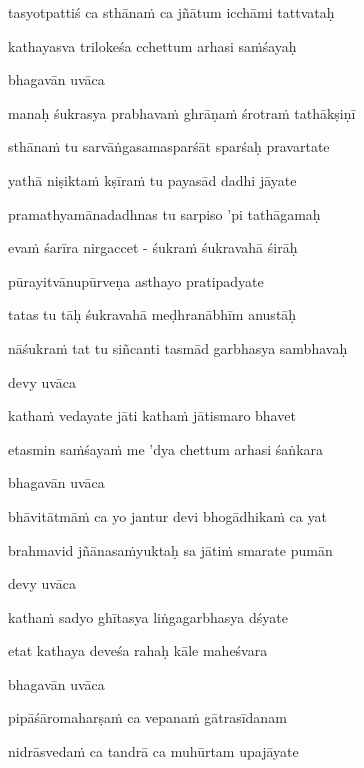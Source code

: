 tasyotpattiś ca sthāna\.m ca jñātum icchāmi tattvataḥ\thinspace{\dandab} \dontdisplaylinenum

kathayasva trilokeśa cchettum arhasi sa\.mśayaḥ \veg\dontdisplaylinenum

bhagavān uvāca~{\dandab}\dontdisplaylinenum 

manaḥ śukrasya prabhava\.m ghrāṇa\.m śrotra\.m tathākṣiṇī\thinspace{\danda} \dontdisplaylinenum

sthāna\.m tu sarvāṅgasamasparśāt sparśaḥ pravartate \veg\dontdisplaylinenum

yathā niṣikta\.m kṣīra\.m tu payasād dadhi jāyate\thinspace{\dandab} \dontdisplaylinenum

pramathyamānadadhnas tu sarpiso 'pi tathāgamaḥ \veg\dontdisplaylinenum

eva\.m śarīra nirgaccet - śukra\.m śukravahā śirāḥ\thinspace{\dandab} \dontdisplaylinenum

pūrayitvānupūrveṇa asthayo pratipadyate \veg\dontdisplaylinenum

tatas tu tāḥ śukravahā meḍhranābhīm anustāḥ\thinspace{\dandab} \dontdisplaylinenum

nāśukra\.m tat tu siñcanti tasmād garbhasya sambhavaḥ \veg\dontdisplaylinenum

devy uvāca~{\dandab}\dontdisplaylinenum 

katha\.m vedayate jāti katha\.m jātismaro bhavet\thinspace{\danda} \dontdisplaylinenum

etasmin sa\.mśaya\.m me 'dya chettum arhasi śaṅkara \veg\dontdisplaylinenum

bhagavān uvāca~{\dandab}\dontdisplaylinenum 

bhāvitātmā\.m ca yo jantur devi bhogādhika\.m ca yat\thinspace{\danda} \dontdisplaylinenum

brahmavid jñānasa\.myuktaḥ sa jāti\.m smarate pumān \veg\dontdisplaylinenum

devy uvāca~{\dandab}\dontdisplaylinenum 

katha\.m sadyo ghītasya liṅgagarbhasya dśyate\thinspace{\danda} \dontdisplaylinenum

etat kathaya deveśa rahaḥ kāle maheśvara \veg\dontdisplaylinenum

bhagavān uvāca~{\dandab}\dontdisplaylinenum 

pipāśāromaharṣa\.m ca vepana\.m gātrasīdanam\thinspace{\danda} \dontdisplaylinenum

nidrāsveda\.m ca tandrā ca muhūrtam upajāyate \veg\dontdisplaylinenum

